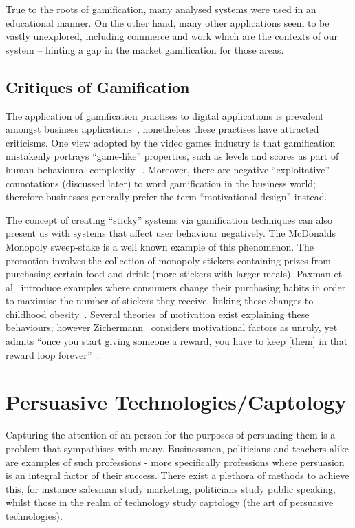 True to the roots of gamification, many analysed systems were used in an educational manner. On the other hand, many other applications seem to be vastly unexplored, including commerce and work which are the contexts of our system -- hinting a gap in the market gamification for those areas. 

\subsection{Critiques of Gamification}
The application of gamification practises to digital applications is prevalent amongst business applications~\cite{gartner70}, nonetheless these practises have attracted criticisms. One view adopted by the video games industry is that gamification mistakenly portrays ``game-like'' properties, such as levels and scores as part of human behavioural complexity.~\cite{bogost2011gamification}. Moreover, there are negative ``exploitative'' connotations (discussed later) to word gamification in the business world; therefore businesses generally prefer the term ``motivational design'' instead. 

The concept of creating ``sticky'' systems via gamification techniques can also present us with systems that affect user behaviour negatively. The McDonalds Monopoly sweep-stake is a well known example of this phenomenon. The promotion involves the collection of monopoly stickers containing prizes from purchasing certain food and drink (more stickers with larger meals). Paxman et al~\cite{mcdonalds} introduce examples where consumers change their purchasing habits in order to maximise the number of stickers they receive, linking these changes to childhood obesity~\cite{mcdonalds}. Several theories of motivation exist explaining these behaviours; however Zichermann~\cite{zichermann2011gamification} considers motivational factors as unruly, yet admits ``once you start giving someone a reward, you have to keep [them] in that reward loop forever''~\cite[p.~27]{zichermann2011gamification}.

\section{Persuasive Technologies/Captology}
Capturing the attention of an person for the purposes of persuading them is a problem that sympathises with many. Businessmen, politicians and teachers alike are examples of such professions - more specifically professions where persuasion is an integral factor of their success. There exist a plethora of methods to achieve this, for instance salesman study marketing, politicians study public speaking, whilst those in the realm of technology study captology (the art of persuasive technologies).

